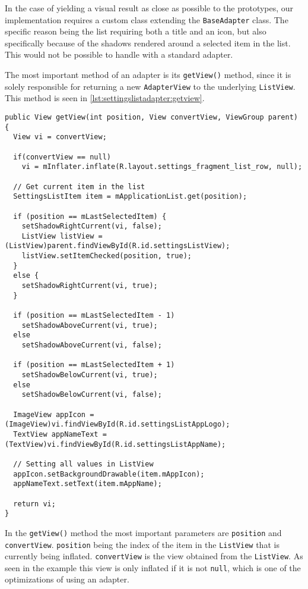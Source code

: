 In the case of yielding a visual result as close as possible to the prototypes, our implementation requires a custom class extending the \lstinline|BaseAdapter| class.
The specific reason being the list requiring both a title and an icon, but also specifically because of the shadows rendered around a selected item in the list.
This would not be possible to handle with a standard adapter.

The most important method of an adapter is its \lstinline|getView()| method, since it is solely responsible for returning a new \lstinline|AdapterView| to the underlying \lstinline|ListView|.
This method is seen in \cref{lst:settingslistadapter:getview}.

\begin{lstlisting}[caption={\lstinline|getView()| method in \lstinline|SettingsListAdapter| class.}, label={lst:settingslistadapter:getview}]
public View getView(int position, View convertView, ViewGroup parent) {
  View vi = convertView;
  
  if(convertView == null)
    vi = mInflater.inflate(R.layout.settings_fragment_list_row, null);
  
  // Get current item in the list
  SettingsListItem item = mApplicationList.get(position);
  
  if (position == mLastSelectedItem) {
    setShadowRightCurrent(vi, false);
    ListView listView = (ListView)parent.findViewById(R.id.settingsListView);
    listView.setItemChecked(position, true);
  }
  else {
    setShadowRightCurrent(vi, true);
  }
  
  if (position == mLastSelectedItem - 1)
    setShadowAboveCurrent(vi, true);
  else
    setShadowAboveCurrent(vi, false);
  
  if (position == mLastSelectedItem + 1)
    setShadowBelowCurrent(vi, true);
  else
    setShadowBelowCurrent(vi, false);
  
  ImageView appIcon = (ImageView)vi.findViewById(R.id.settingsListAppLogo);
  TextView appNameText = (TextView)vi.findViewById(R.id.settingsListAppName);
  
  // Setting all values in ListView
  appIcon.setBackgroundDrawable(item.mAppIcon);
  appNameText.setText(item.mAppName);
  
  return vi;
}
\end{lstlisting}

In the \lstinline|getView()| method the most important parameters are \lstinline|position| and \lstinline|convertView|.
\lstinline|position| being the index of the item in the \lstinline|ListView| that is currently being inflated.
\lstinline|convertView| is the view obtained from the \lstinline|ListView|.
As seen in the example this view is only inflated if it is not \lstinline|null|, which is one of the optimizations of using an adapter.

